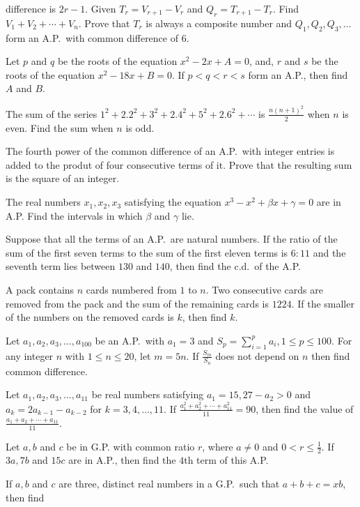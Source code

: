   difference is $2r - 1$. Given $T_r = V_{r + 1} - V_r$ and $Q_r = T_{r + 1} - T_r$. Find $V_1 + V_2
  + \cdots + V_n$. Prove that $T_r$ is always a composite number and $Q_1, Q_2, Q_3, \ldots$ form an
  A.P.\ with common difference of $6$.
\item Let $p$ and $q$ be the roots of the equation $x^2 - 2x + A = 0$, and, $r$ and $s$ be the roots of the
  equation $x^2 - 18x + B = 0$. If $p < q < r < s$ form an A.P., then find $A$ and $B$.
\item The sum of the series $1^2 + 2.2^2 + 3^2 + 2.4^2 + 5^2 + 2.6^2 + \cdots$ is $\frac{n(n + 1)^2}{2}$
  when $n$ is even. Find the sum when $n$ is odd.
\item The fourth power of the common difference of an A.P.\ with integer entries is added to the produt of
  four consecutive terms of it. Prove that the resulting sum is the square of an integer.
\item The real numbers $x_1, x_2, x_3$ satisfying the equation $x^3 - x^2 + \beta x + \gamma = 0$ are in
  A.P. Find the intervals in which $\beta$ and $\gamma$ lie.
\item Suppose that all the terms of an A.P.\ are natural numbers. If the ratio of the sum of the first seven
  terms to the sum of the first eleven terms is $6:11$ and the seventh term lies between $130$ and $140$,
  then find the c.d.\ of the A.P.
\item A pack contains $n$ cards numbered from $1$ to $n$. Two consecutive cards are removed from the pack
  and the sum of the remaining cards is $1224$. If the smaller of the numbers on the removed cards is $k$,
  then find $k$.
\item Let $a_1, a_2, a_3, \ldots, a_{100}$ be an A.P.\ with $a_1 = 3$ and $S_p = \displaystyle\sum_{i =
  1}^pa_i, 1\leq p\leq 100$. For any integer $n$ with $1\leq n\leq 20$, let $m = 5n$. If $\frac{S_m}{S_n}$
  does not depend on $n$ then find common difference.
\item Let $a_1, a_2, a_3, \ldots, a_{11}$ be real numbers satisfying $a_1 = 15, 27 - a_2 > 0$ and $a_k =
  2a_{k - 1} - a_{k - 2}$ for $k = 3, 4, \ldots, 11$. If $\frac{a_1^2 + a_2^2 + \cdots + a_{11}^2}{11} =
  90$, then find the value of $\frac{a_1 + a_2 + \cdots + a_{11}}{11}$.
\item Let $a, b$ and $c$ be in G.P. with common ratio $r$, where $a\neq 0$ and $0 < r \leq \frac{1}{2}$. If
  $3a, 7b$ and $15c$ are in A.P., then find the $4$th term of this A.P.
\item If $a, b$ and $c$ are three, distinct real numbers in a G.P.\ such that $a + b + c = xb$, then find
